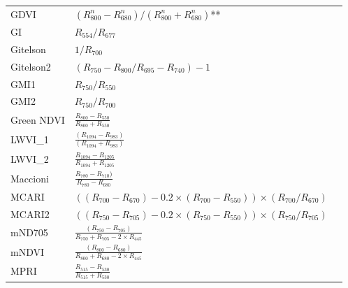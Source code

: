 \documentclass[letterpaper, peerreview, draftcls]{IEEEtran}
\begin{document}
\begin{xtabular*}{0.3\textwidth}{lll}
	GDVI            & $(R_{800}^n-R_{680}^n) / (R_{800}^n+R_{680}^n)$**                                                   & \cite{wu2014}                  \\
	GI              & $R_{554}/R_{677}$                                                                                   & \cite{smith1995}        \\
	Gitelson        & $1/R_{700}$                                                                                         & \cite{gitelson1999}     \\
	Gitelson2       & $(R_{750}-R_{800}/R_{695}-R_{740})-1$                                                               & \cite{gitelson2003}   \\
	GMI1            & $R_{750}/R_{550}$                                                                                   & \cite{gitelson2003}     \\
	GMI2            & $R_{750}/R_{700}$                                                                                   & \cite{gitelson2003}     \\
	Green NDVI      & $\frac{R_{800}-R_{550}}{R_{800}+R_{550}}$                                                           & \cite{gitelson1996}     \\
	LWVI\_1         & $\frac{(R_{1094}-R_{983})}{(R_{1094}+R_{983})}$                                                     & \cite{galvao2005}       \\
	LWVI\_2         & $\frac{R_{1094}-R_{1205}}{R_{1094}+R_{1205}}$                                                       & \cite{galvao2005}       \\
	Maccioni        & $\frac{R_{780}-R_{710})}{R_{780}-R_{680}}$                                                          & \cite{maccioni2001}     \\
	\midrule
	MCARI           & \parbox{5.5cm}{$((R_{700}-R_{670})-0.2\times (R_{700}-R_{550})) \times (R_{700}/R_{670})$}          & \cite{daughtry2000}     \\
	\midrule
	MCARI2          & \parbox{5.5cm}{$((R_{750}-R_{705})-0.2 \times (R_{750}-R_{550})) \times (R_{750}/R_{705})$}         & \cite{wu2008a}           \\
	\midrule
	mND705          & $\frac{(R_{750}-R_{705})}{R_{750}+R_{705}-2\times R_{445}}$ & \cite{sims2002a} \\
	mNDVI           &  $\frac{(R_{800}-R_{680})}{R_{800}+R_{680}-2 \times R_{445}}$ & \cite{sims2002a} \\
	MPRI            & $\frac{R_{515}-R_{530}}{R_{515}+R_{530}}$                                                           & \cite{hernandez-clemente2011}\\

\end{xtabular*}
\end{document}
